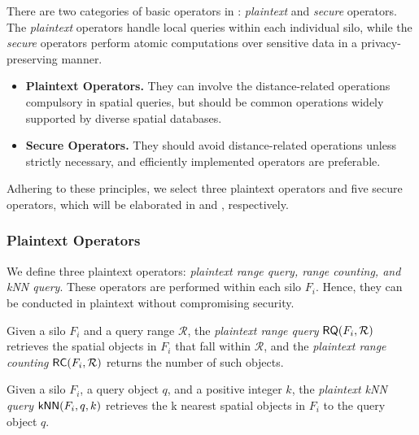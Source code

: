 There are two categories of basic operators in \sysname: \textit{plaintext} and \textit{secure} operators. 
The \textit{plaintext} operators handle local queries within each individual silo, while the \textit{secure} operators perform atomic computations over sensitive data in a privacy-preserving manner.
\begin{itemize}
    \item \textbf{Plaintext Operators.} 
    They can involve the distance-related operations compulsory in spatial queries, but should be common operations widely supported by diverse spatial databases.
    
    \item \textbf{Secure Operators.} 
    They should avoid distance-related operations unless strictly necessary, and efficiently implemented operators are preferable.
\end{itemize}

Adhering to these principles, we select three plaintext operators and five secure operators, which will be elaborated in  and , respectively.

\subsubsection{Plaintext Operators}
\label{sec:in-silo}

We define three plaintext operators: \textit{plaintext range query, range counting, and kNN query}.
These operators are performed within each silo $F_i$.
Hence, they can be conducted in plaintext without compromising security. 

\begin{definition}
\label{def:prq}
    Given a silo $F_i$ and a query range $\mathcal{R}$, the \textit{plaintext range query} $\textsf{RQ}(F_i, \mathcal{R})$ retrieves the spatial objects in $F_i$ that fall within $\mathcal{R}$, 
    and the \textit{plaintext range counting} $\textsf{RC}(F_i, \mathcal{R})$ returns the number of such objects.
\end{definition}

\begin{definition}
\label{def:pknn}
    Given a silo $F_i$, a query object $q$, and a positive integer $k$, the \textit{plaintext kNN query} $\textsf{kNN}(F_i, q, k)$ retrieves the k nearest spatial objects in $F_i$ to the query object $q$.
\end{definition}

